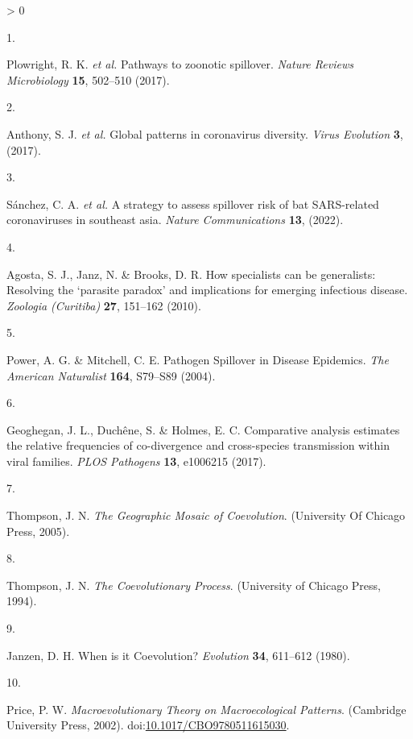 \documentclass[10pt,oneside]{article}
\newlength{\cslhangindent}
\newlength{\csllabelwidth}
\newenvironment{CSLReferences}[3] %
 {%
  \setlength{\parindent}{0pt}
  \ifodd #1 \everypar{\setlength{\hangindent}{\cslhangindent}}\ignorespaces\fi
  \ifnum #2 > 0
  \setlength{\parskip}{#2\baselineskip}
  \fi
 }%
 {}
\newcommand{\CSLLeftMargin}[1]{\parbox[t]{\maxof{\widthof{#1}}{\csllabelwidth}}{#1}}
\newcommand{\CSLRightInline}[1]{\parbox[t]{\linewidth}{#1}}
\begin{document}
\hypertarget{refs}{}
\begin{CSLReferences}{0}{0}
\leavevmode\hypertarget{ref-Plowright2017Pathways}{}%
\CSLLeftMargin{1. }
\CSLRightInline{Plowright, R. K. \emph{et al.} Pathways to zoonotic
spillover. \emph{Nature Reviews Microbiology} \textbf{15}, 502--510
(2017).}

\leavevmode\hypertarget{ref-Anthony2017Global}{}%
\CSLLeftMargin{2. }
\CSLRightInline{Anthony, S. J. \emph{et al.} Global patterns in
coronavirus diversity. \emph{Virus Evolution} \textbf{3}, (2017).}

\leavevmode\hypertarget{ref-Sanchez2022Strategy}{}%
\CSLLeftMargin{3. }
\CSLRightInline{Sánchez, C. A. \emph{et al.} A strategy to assess
spillover risk of bat SARS-related coronaviruses in southeast asia.
\emph{Nature Communications} \textbf{13}, (2022).}

\leavevmode\hypertarget{ref-Agosta2010How}{}%
\CSLLeftMargin{4. }
\CSLRightInline{Agosta, S. J., Janz, N. \& Brooks, D. R. How specialists
can be generalists: Resolving the {`parasite paradox'} and implications
for emerging infectious disease. \emph{Zoologia (Curitiba)} \textbf{27},
151--162 (2010).}

\leavevmode\hypertarget{ref-Power2004Pathogen}{}%
\CSLLeftMargin{5. }
\CSLRightInline{Power, A. G. \& Mitchell, C. E. Pathogen Spillover in
Disease Epidemics. \emph{The American Naturalist} \textbf{164}, S79--S89
(2004).}

\leavevmode\hypertarget{ref-Geoghegan2017Comparative}{}%
\CSLLeftMargin{6. }
\CSLRightInline{Geoghegan, J. L., Duchêne, S. \& Holmes, E. C.
Comparative analysis estimates the relative frequencies of co-divergence
and cross-species transmission within viral families. \emph{PLOS
Pathogens} \textbf{13}, e1006215 (2017).}

\leavevmode\hypertarget{ref-Thompson2005Geographic}{}%
\CSLLeftMargin{7. }
\CSLRightInline{Thompson, J. N. \emph{The Geographic Mosaic of
Coevolution}. (University Of Chicago Press, 2005).}

\leavevmode\hypertarget{ref-Thompson1994Coevolutionary}{}%
\CSLLeftMargin{8. }
\CSLRightInline{Thompson, J. N. \emph{The Coevolutionary Process}.
(University of Chicago Press, 1994).}

\leavevmode\hypertarget{ref-Janzen1980When}{}%
\CSLLeftMargin{9. }
\CSLRightInline{Janzen, D. H. When is it Coevolution? \emph{Evolution}
\textbf{34}, 611--612 (1980).}

\leavevmode\hypertarget{ref-Price2002Macroevolutionary}{}%
\CSLLeftMargin{10. }
\CSLRightInline{Price, P. W. \emph{Macroevolutionary Theory on
Macroecological Patterns}. (Cambridge University Press, 2002).
doi:\href{https://doi.org/10.1017/CBO9780511615030}{10.1017/CBO9780511615030}.}


\end{CSLReferences}
\end{document}

